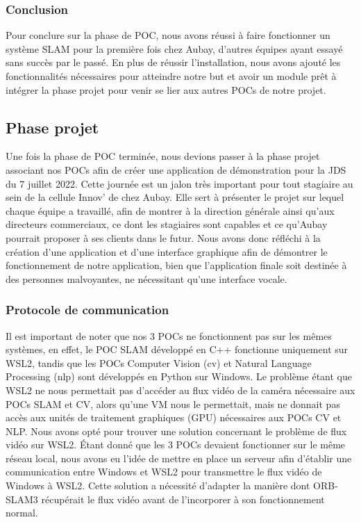 \documentclass[11pt]{article}
\begin{document}
      \subsubsection{Conclusion}
        Pour conclure sur la phase de POC, nous avons réussi à faire fonctionner un système SLAM pour la première fois chez Aubay, d'autres
        équipes ayant essayé sans succès par le passé. En plus de réussir l'installation, nous avons ajouté les fonctionnalités nécessaires
        pour atteindre notre but et avoir un module prêt à intégrer la phase projet pour venir se lier aux autres POCs de notre projet.

    \subsection{Phase projet}
      Une fois la phase de POC terminée, nous devions passer à la phase projet associant nos POCs
      afin de créer une application de démonstration pour la JDS du 7 juillet 2022. Cette journée est un jalon très important
      pour tout stagiaire au sein de la cellule Innov' de chez Aubay. Elle sert à présenter le projet sur lequel chaque équipe a travaillé,
      afin de montrer à la direction générale ainsi qu'aux directeurs commerciaux, ce dont les stagiaires sont capables et ce qu'Aubay pourrait
      proposer à ses clients dans le futur. Nous avons donc réfléchi à la création d'une application et d'une
      interface graphique afin de démontrer le fonctionnement de notre application, bien que l'application finale soit destinée 
      à des personnes malvoyantes, ne nécessitant qu'une interface vocale.

      \subsubsection{Protocole de communication}
        Il est important de noter que nos 3 POCs ne fonctionnent pas sur les mêmes systèmes, en effet, le POC SLAM développé en C++
        fonctionne uniquement sur WSL2, tandis que les POCs Computer Vision (\acrshort{cv}) et Natural Language Processing (\acrshort{nlp}) 
        sont développés en Python sur Windows. Le problème étant que WSL2 ne nous permettait pas d'accéder au flux vidéo de la caméra nécessaire 
        aux POCs SLAM et CV, alors qu'une VM nous le permettait, mais ne donnait pas accès aux unités de traitement graphiques (GPU) nécessaires aux 
        POCs CV et NLP. Nous avons opté pour 
        trouver une solution concernant le problème de flux vidéo sur WSL2. Étant donné que les 3 POCs devaient fonctionner sur le même réseau 
        local, nous avons eu l'idée de mettre en place un serveur afin d'établir une communication entre Windows et WSL2 pour transmettre le flux 
        vidéo de Windows à WSL2. Cette solution a nécessité d'adapter la manière dont ORB-SLAM3 récupérait le flux vidéo avant de l'incorporer à 
        son fonctionnement normal.
\end{document}
